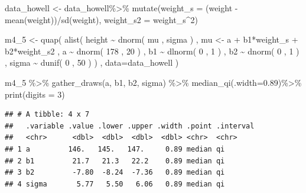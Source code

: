 \documentclass[
]{book}
\newenvironment{Shaded}{\begin{snugshade}}{\end{snugshade}}
\newcommand{\AttributeTok}[1]{\textcolor[rgb]{0.77,0.63,0.00}{#1}}
\newcommand{\DecValTok}[1]{\textcolor[rgb]{0.00,0.00,0.81}{#1}}
\newcommand{\FloatTok}[1]{\textcolor[rgb]{0.00,0.00,0.81}{#1}}
\newcommand{\FunctionTok}[1]{\textcolor[rgb]{0.00,0.00,0.00}{#1}}
\newcommand{\NormalTok}[1]{#1}
\newcommand{\OtherTok}[1]{\textcolor[rgb]{0.56,0.35,0.01}{#1}}
\newcommand{\SpecialCharTok}[1]{\textcolor[rgb]{0.00,0.00,0.00}{#1}}
\begin{document}
\begin{Shaded}
\begin{Highlighting}[]
\NormalTok{data\_howell }\OtherTok{\textless{}{-}}\NormalTok{ data\_howell}\SpecialCharTok{\%\textgreater{}\%}
  \FunctionTok{mutate}\NormalTok{(}\AttributeTok{weight\_s =}\NormalTok{ (weight }\SpecialCharTok{{-}} \FunctionTok{mean}\NormalTok{(weight))}\SpecialCharTok{/}\FunctionTok{sd}\NormalTok{(weight),}
         \AttributeTok{weight\_s2 =}\NormalTok{ weight\_s}\SpecialCharTok{\^{}}\DecValTok{2}\NormalTok{)}

\NormalTok{m4\_5 }\OtherTok{\textless{}{-}} \FunctionTok{quap}\NormalTok{(}
    \FunctionTok{alist}\NormalTok{(}
\NormalTok{        height }\SpecialCharTok{\textasciitilde{}} \FunctionTok{dnorm}\NormalTok{( mu , sigma ) ,}
\NormalTok{        mu }\OtherTok{\textless{}{-}}\NormalTok{ a }\SpecialCharTok{+}\NormalTok{ b1}\SpecialCharTok{*}\NormalTok{weight\_s }\SpecialCharTok{+}\NormalTok{ b2}\SpecialCharTok{*}\NormalTok{weight\_s2 ,}
\NormalTok{        a }\SpecialCharTok{\textasciitilde{}} \FunctionTok{dnorm}\NormalTok{( }\DecValTok{178}\NormalTok{ , }\DecValTok{20}\NormalTok{ ) ,}
\NormalTok{        b1 }\SpecialCharTok{\textasciitilde{}} \FunctionTok{dlnorm}\NormalTok{( }\DecValTok{0}\NormalTok{ , }\DecValTok{1}\NormalTok{ ) ,}
\NormalTok{        b2 }\SpecialCharTok{\textasciitilde{}} \FunctionTok{dnorm}\NormalTok{( }\DecValTok{0}\NormalTok{ , }\DecValTok{1}\NormalTok{ ) ,}
\NormalTok{        sigma }\SpecialCharTok{\textasciitilde{}} \FunctionTok{dunif}\NormalTok{( }\DecValTok{0}\NormalTok{ , }\DecValTok{50}\NormalTok{ )}
\NormalTok{    ) , }\AttributeTok{data=}\NormalTok{data\_howell )}

\NormalTok{m4\_5 }\SpecialCharTok{\%\textgreater{}\%}
  \FunctionTok{gather\_draws}\NormalTok{(a, b1, b2, sigma) }\SpecialCharTok{\%\textgreater{}\%}
  \FunctionTok{median\_qi}\NormalTok{(}\AttributeTok{.width=}\FloatTok{0.89}\NormalTok{)}\SpecialCharTok{\%\textgreater{}\%}
  \FunctionTok{print}\NormalTok{(}\AttributeTok{digits =} \DecValTok{3}\NormalTok{)}
\end{Highlighting}
\end{Shaded}

\begin{verbatim}
## # A tibble: 4 x 7
##   .variable .value .lower .upper .width .point .interval
##   <chr>      <dbl>  <dbl>  <dbl>  <dbl> <chr>  <chr>    
## 1 a         146.   145.   147.     0.89 median qi       
## 2 b1         21.7   21.3   22.2    0.89 median qi       
## 3 b2         -7.80  -8.24  -7.36   0.89 median qi       
## 4 sigma       5.77   5.50   6.06   0.89 median qi
\end{verbatim}
\end{document}
